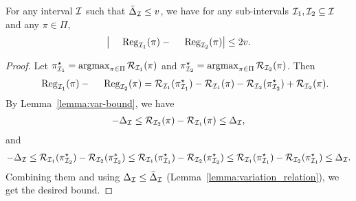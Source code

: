 \begin{lemma}\label{lemma:variation and regret}
For any interval ${\mathcal{I}}$ such that $\bar{\Delta}_{\mathcal{I}}\leq v$, we have for any sub-intervals ${\mathcal{I}}_1, {\mathcal{I}}_2\subseteq {\mathcal{I}}$ and any $\pi\in\Pi$, 
\begin{align*}
\bigabs{\Reg_{\calI_1}(\pi)-\Reg_{\calI_2}(\pi)} \leq 2v.
\end{align*}
\end{lemma}
\begin{proof}
Let $\pi_{{\mathcal{I}}_1}^\star=\operatorname*{argmax}_{\pi\in\Pi}{\mathcal{R}}_{{\mathcal{I}}_1}(\pi)$ and $\pi_{{\mathcal{I}}_2}^\star=\operatorname*{argmax}_{\pi\in\Pi}{\mathcal{R}}_{{\mathcal{I}}_2}(\pi)$. Then 
\begin{align*}
\Reg_{\calI_1}(\pi)-\Reg_{\calI_2}(\pi)=\calR_{\calI_1}(\pi_{\calI_1}^\star)-\calR_{\calI_1}(\pi)-\calR_{\calI_2}(\pi_{\calI_2}^\star)+\calR_{\calI_2}(\pi).
\end{align*}
By Lemma~\ref{lemma:var-bound}, we have
\begin{align*}
-\Delta_{\mathcal{I}}\leq {\mathcal{R}}_{{\mathcal{I}}_2}(\pi)-{\mathcal{R}}_{{\mathcal{I}}_1}(\pi)\leq \Delta_{\mathcal{I}} , 
\end{align*}
and 
\begin{align*}
-\Delta_{\mathcal{I}}\leq {\mathcal{R}}_{{\mathcal{I}}_1}(\pi_{{\mathcal{I}}_2}^\star)-{\mathcal{R}}_{{\mathcal{I}}_2}(\pi_{{\mathcal{I}}_2}^*) \leq {\mathcal{R}}_{{\mathcal{I}}_1}(\pi_{{\mathcal{I}}_1}^\star)-{\mathcal{R}}_{{\mathcal{I}}_2}(\pi_{{\mathcal{I}}_2}^\star)\leq {\mathcal{R}}_{{\mathcal{I}}_1}(\pi_{{\mathcal{I}}_1}^\star)-{\mathcal{R}}_{{\mathcal{I}}_2}(\pi_{{\mathcal{I}}_1}^\star)\leq \Delta_{\mathcal{I}}. 
\end{align*}
Combining them and using $\Delta_{\mathcal{I}}\leq \bar{\Delta}_{\mathcal{I}}$ (Lemma~\ref{lemma:variation_relation}), we get the desired bound.
\end{proof}

